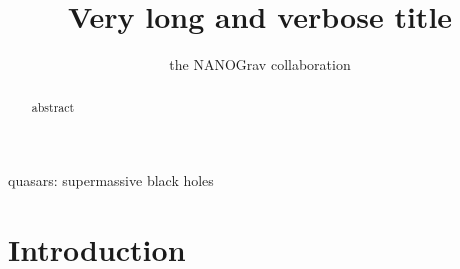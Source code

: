 %
%
%






\def\oldbibitem{} \let\oldbibitem=\bibitem
\def\bibitem{\stepcounter{citnum}\oldbibitem}

\newcommand{\orcidauthorA}{0000-0002-6625-6450} %

\title[Short Title]{Very long and verbose title}
\author[NANOGrav]{the NANOGrav collaboration}




\maketitle

\begin{abstract}
    abstract
\end{abstract}

\begin{keywords}
    quasars: supermassive black holes
\end{keywords}



\section{Introduction}
    \label{sec:intro}



